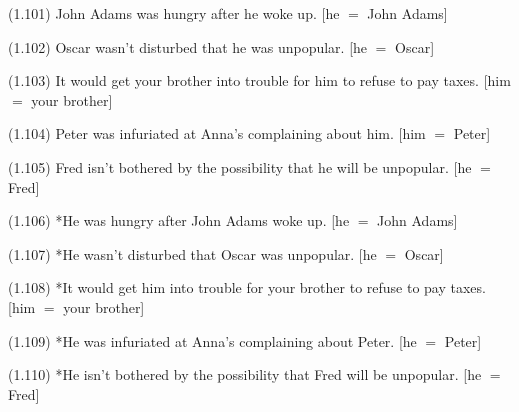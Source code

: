 \documentclass{article}
\begin{document}
\begin{enumerate*}
\item[(1.101)] John Adams was hungry after he woke up.
[he ${=}$ John Adams]
\item[(1.102)] Oscar wasn't disturbed that he was unpopular.
[he ${=}$ Oscar]
\item[(1.103)] It would get your brother into trouble for him
to refuse to pay taxes. [him ${=}$ your brother]
\item[(1.104)] Peter was infuriated at Anna's complaining
about him. [him ${=}$ Peter]
\item[(1.105)] Fred isn't bothered by the possibility that he
will be unpopular. [he ${=}$ Fred]
\end{enumerate*}

\bigbreak
\begin{minipage}{\textwidth}
\centering
{}
\bigbreak
\vbox{}
\end{minipage}
\bigbreak

\begin{enumerate*}
\item[(1.106)] *He was hungry after John Adams woke up.
[he ${=}$ John Adams]
\item[(1.107)] *He wasn't disturbed that Oscar was unpopular.
[he ${=}$ Oscar]
\item[(1.108)] *It would get him into trouble for your brother
to refuse to pay taxes. [him ${=}$ your brother]
\item[(1.109)] *He was infuriated at Anna's complaining about
Peter. [he ${=}$ Peter]
\item[(1.110)] *He isn't bothered by the possibility that Fred
will be unpopular. [he ${=}$ Fred]
\end{enumerate*}
\end{document}
